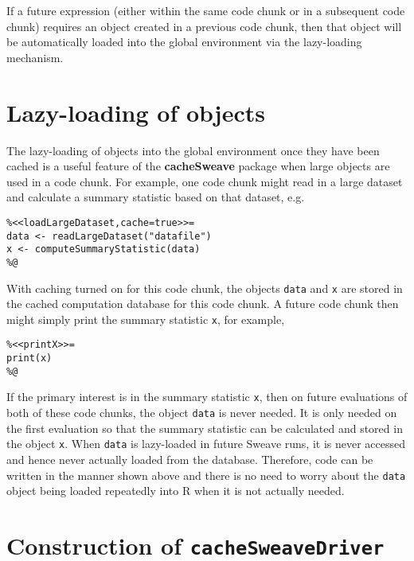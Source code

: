 \documentclass{article}
\newcommand{\proglang}{\textsf}
\newcommand{\code}{\texttt}
\newcommand{\pkg}{\textbf}
\begin{document}
If a future expression (either within the same code chunk or in a
subsequent code chunk) requires an object created in a previous code
chunk, then that object will be automatically loaded into the global
environment via the lazy-loading mechanism.

\section{Lazy-loading of objects}

The lazy-loading of objects into the global environment once they have
been cached is a useful feature of the \pkg{cacheSweave} package when
large objects are used in a code chunk.  For example, one code chunk
might read in a large dataset and calculate a summary statistic based
on that dataset, e.g.
\begin{verbatim}
%<<loadLargeDataset,cache=true>>=
data <- readLargeDataset("datafile")
x <- computeSummaryStatistic(data)
%@
\end{verbatim}
With caching turned on for this code chunk, the objects \code{data}
and \code{x} are stored in the cached computation database for this
code chunk.  A future code chunk then might simply print the summary
statistic \code{x}, for example,
\begin{verbatim}
%<<printX>>=
print(x)
%@
\end{verbatim}
If the primary interest is in the summary statistic \code{x}, then on
future evaluations of both of these code chunks, the object
\code{data} is never needed.  It is only needed on the first
evaluation so that the summary statistic can be calculated and stored
in the object \code{x}.  When \code{data} is lazy-loaded in future
Sweave runs, it is never accessed and hence never actually loaded from
the database.  Therefore, code can be written in the manner shown
above and there is no need to worry about the \code{data} object being
loaded repeatedly into \proglang{R} when it is not actually needed.


\section[Construction of cacheSweaveDriver]{Construction of \code{cacheSweaveDriver}}
\end{document}
